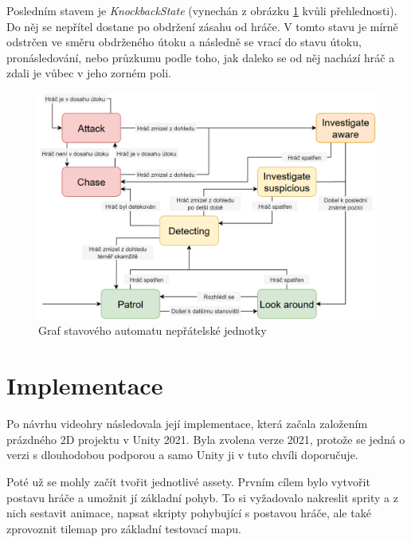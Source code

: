 \documentclass[FM,Proj]{tulthesis}
\begin{document}
	Posledním stavem je \textit{KnockbackState} (vynechán z obrázku \ref{imgFSM} kvůli přehlednosti). Do něj se nepřítel dostane po obdržení zásahu od hráče. V tomto stavu je mírně odstrčen ve směru obdrženého útoku a následně se vrací do stavu útoku, pronásledování, nebo průzkumu podle toho, jak daleko se od něj nachází hráč a zdali je vůbec v jeho zorném poli.
	
	\begin{figure}[ht]
		\centering
		\includegraphics[width=\textwidth]{img/FSM}
		\caption{Graf stavového automatu nepřátelské jednotky}
		\label{imgFSM}
	\end{figure}
	
	
	\chapter{Implementace}
	
	Po návrhu videohry následovala její implementace, která začala založením prázdného 2D projektu v Unity 2021. Byla zvolena verze 2021, protože se jedná o verzi s dlouhodobou podporou a samo Unity ji v tuto chvíli doporučuje.
	
	Poté už se mohly začít tvořit jednotlivé assety. Prvním cílem bylo vytvořit postavu hráče a umožnit jí základní pohyb. To si vyžadovalo nakreslit sprity a z nich sestavit animace, napsat skripty pohybující s postavou hráče, ale také zprovoznit tilemap pro základní testovací mapu.
	
\end{document}
